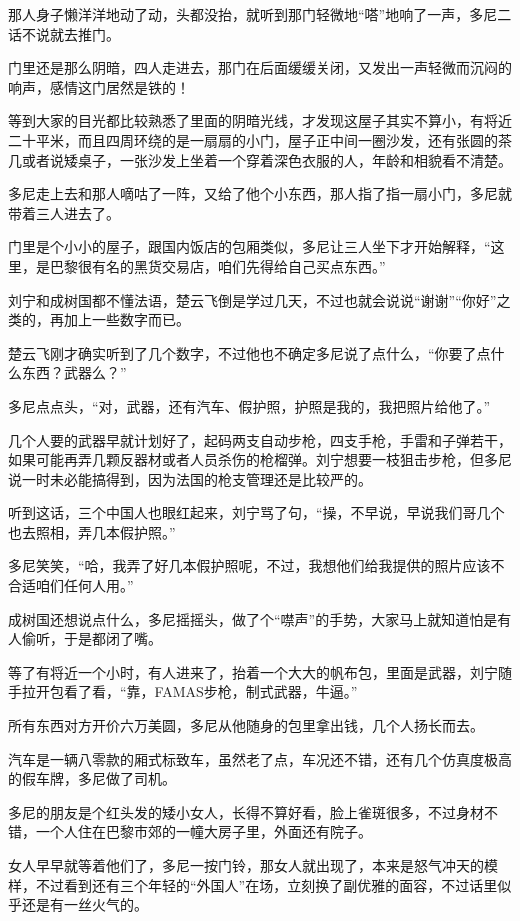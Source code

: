 那人身子懒洋洋地动了动，头都没抬，就听到那门轻微地“嗒”地响了一声，多尼二话不说就去推门。

门里还是那么阴暗，四人走进去，那门在后面缓缓关闭，又发出一声轻微而沉闷的响声，感情这门居然是铁的！

等到大家的目光都比较熟悉了里面的阴暗光线，才发现这屋子其实不算小，有将近二十平米，而且四周环绕的是一扇扇的小门，屋子正中间一圈沙发，还有张圆的茶几或者说矮桌子，一张沙发上坐着一个穿着深色衣服的人，年龄和相貌看不清楚。

多尼走上去和那人嘀咕了一阵，又给了他个小东西，那人指了指一扇小门，多尼就带着三人进去了。

门里是个小小的屋子，跟国内饭店的包厢类似，多尼让三人坐下才开始解释，“这里，是巴黎很有名的黑货交易店，咱们先得给自己买点东西。”

刘宁和成树国都不懂法语，楚云飞倒是学过几天，不过也就会说说“谢谢”“你好”之类的，再加上一些数字而已。

楚云飞刚才确实听到了几个数字，不过他也不确定多尼说了点什么，“你要了点什么东西？武器么？”

多尼点点头，“对，武器，还有汽车、假护照，护照是我的，我把照片给他了。”

几个人要的武器早就计划好了，起码两支自动步枪，四支手枪，手雷和子弹若干，如果可能再弄几颗反器材或者人员杀伤的枪榴弹。刘宁想要一枝狙击步枪，但多尼说一时未必能搞得到，因为法国的枪支管理还是比较严的。

听到这话，三个中国人也眼红起来，刘宁骂了句，“操，不早说，早说我们哥几个也去照相，弄几本假护照。”

多尼笑笑，“哈，我弄了好几本假护照呢，不过，我想他们给我提供的照片应该不合适咱们任何人用。”

成树国还想说点什么，多尼摇摇头，做了个“噤声”的手势，大家马上就知道怕是有人偷听，于是都闭了嘴。

等了有将近一个小时，有人进来了，抬着一个大大的帆布包，里面是武器，刘宁随手拉开包看了看，“靠，FAMAS步枪，制式武器，牛逼。”

所有东西对方开价六万美圆，多尼从他随身的包里拿出钱，几个人扬长而去。

汽车是一辆八零款的厢式标致车，虽然老了点，车况还不错，还有几个仿真度极高的假车牌，多尼做了司机。

多尼的朋友是个红头发的矮小女人，长得不算好看，脸上雀斑很多，不过身材不错，一个人住在巴黎市郊的一幢大房子里，外面还有院子。

女人早早就等着他们了，多尼一按门铃，那女人就出现了，本来是怒气冲天的模样，不过看到还有三个年轻的“外国人”在场，立刻换了副优雅的面容，不过话里似乎还是有一丝火气的。

